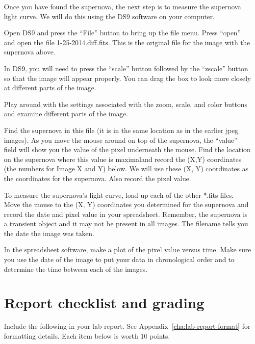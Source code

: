 Once you have found the supernova, the next step is to measure the
supernova light curve. We will do this using the DS9 software on your
computer.
\begin{steps}
	\item Open DS9 and press the “File” button to bring up the file
	menu. Press “open” and open the file 1-25-2014.diff.fits. This is the
	original file for the image with the supernova above.
\end{steps}

In DS9, you will need to press the “scale” button followed by the “zscale”
button so that the image will appear properly. You can drag the box to
look more closely at different parts of the image.
\begin{steps}
	\item Play around with the
	settings associated with the zoom, scale, and color buttons and examine
	different parts of the image.
	
	\item Find the supernova in this file (it is in the same location as in the earlier
	jpeg images). As you move the mouse around on top of the supernova,
	the “value” field will show you the value of the pixel underneath the
	mouse. Find the location on the supernova where this value is maximaland record the (X,Y) coordinates (the numbers for Image X and Y)
	below. We will use these (X, Y) coordinates as the coordinates for the
	supernova. Also record the pixel value.
	
	\item To measure the supernova’s light curve, load up each of the other *.fits
	files. Move the mouse to the (X, Y) coordinates you determined for the
	supernova and record the date and pixel value in your spreadsheet. Remember, the
	supernova is a transient object and it may not be present in all images.
	The filename tells you the date the image was taken.
	
	\item In the spreadsheet software, make a plot of the pixel value versus time. Make sure you use
	the date of the image to put your data in chronological order and to
	determine the time between each of the images.
\end{steps}

\section{Report checklist and grading}

Include the following in your lab report. See Appendix~\ref{cha:lab-report-format} for formatting details. Each item below is worth 10 points.

